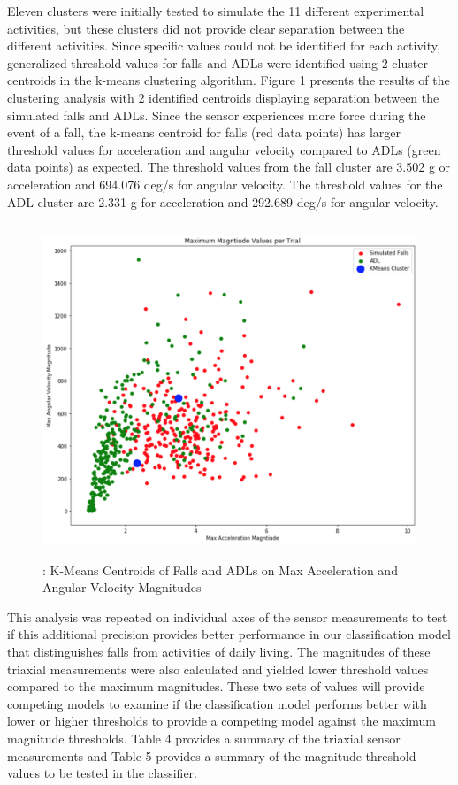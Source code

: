\documentclass{llncs}
\begin{document}
	Eleven clusters were initially tested to simulate the 11 different experimental activities, but these clusters did not provide clear separation between the different activities. Since specific values could not be identified for each activity, generalized threshold values for falls and ADLs were identified using 2 cluster centroids in the k-means clustering algorithm. Figure 1 presents the results of the clustering analysis with 2 identified centroids displaying separation between the simulated falls and ADLs. Since the sensor experiences more force during the event of a fall, the k-means centroid for falls (red data points) has larger threshold values for acceleration and angular velocity compared to ADLs (green data points) as expected. The threshold values from the fall cluster are 3.502 g or acceleration and 694.076 deg/s for angular velocity. The threshold values for the ADL cluster are 2.331 g for acceleration and 292.689 deg/s for angular velocity. 

\begin{figure}
	\centering
	\includegraphics[width=12cm, height=10cm]{images/MaxMagnitudeClusters.png} 
	\caption{: K-Means Centroids of Falls and ADLs on Max Acceleration and Angular Velocity Magnitudes}
	\label{Figure 1: K-Means Clusters of Maximum Magnitude Values per Trial}
\end{figure}

	This analysis was repeated on individual axes of the sensor measurements to test if this additional precision provides better performance in our classification model that distinguishes falls from activities of daily living. The magnitudes of these triaxial measurements were also calculated and yielded lower threshold values compared to the maximum magnitudes. These two sets of values will provide competing models to examine if the classification model performs better with lower or higher thresholds to provide a competing model against the maximum magnitude thresholds. Table 4 provides a summary of the triaxial sensor measurements and Table 5 provides a summary of the magnitude threshold values to be tested in the classifier.
	
\end{document}
